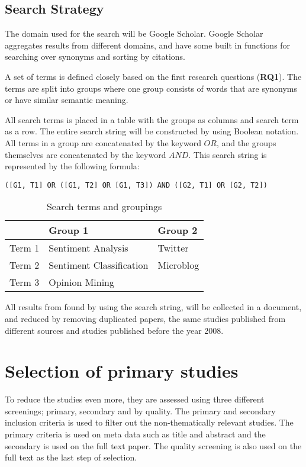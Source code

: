 \subsection{Search Strategy}

The domain used for the search will be Google Scholar. Google Scholar aggregates results from different domains, and have some built in functions for searching over synonyms and sorting by citations. 

A set of terms is defined closely based on the first research questions (\textbf{RQ1}). The terms are split into groups where one group consists of words that are synonyms or have similar semantic meaning.

All search terms is placed in a table with the groups as columns and search term as a row. The entire search string will be constructed by using Boolean notation. All terms in a group are concatenated by the keyword $OR$, and the groups themselves are concatenated by the keyword $AND$. This search string is represented by the following formula: 

\begin{verbatim}
([G1, T1] OR ([G1, T2] OR [G1, T3]) AND ([G2, T1] OR [G2, T2]) 
\end{verbatim}

\begin{table}[htdp]
\begin{center}
\begin{tabular}{|l|l|l|}\hline

& Group 1 & Group 2  \\\hline
Term 1 & Sentiment Analysis & Twitter \\\hline
Term 2 & Sentiment Classification & Microblog \\\hline
Term 3 & Opinion Mining &  \\\hline

\end{tabular}
\caption{Search terms and groupings}
\end{center}
\label{tab:searchterms}
\end{table}

All results from found by using the search string, will be collected in a document, and reduced by removing duplicated papers, the same studies published from different sources and studies published before the year 2008.


\section{Selection of primary studies}
To reduce the studies even more, they are assessed using three different screenings; primary, secondary and by quality. The primary and secondary inclusion criteria is used to filter out the non-thematically relevant studies. The primary criteria is used on meta data such as title and abstract and the secondary is used on the full text paper. The quality screening is also used on the full text as the last step of selection.

